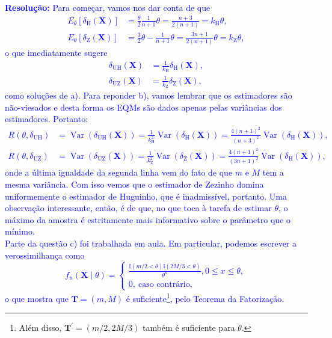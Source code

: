 \documentclass[a4paper,10pt, notitlepage]{report}
\newcommand{\vr}{\operatorname{Var}} %
\newcommand{\bX}{\boldsymbol{X}} %
\begin{document}
\textcolor{blue}{
\textbf{Resolução:} Para começar, vamos nos dar conta de que 
\begin{align*}
 E_\theta\left[\delta_{\text{H}}(\bX)\right] &= \frac{\theta}{2} \frac{1}{n+1}\theta = \frac{n+3}{2(n+1)} = k_{\text{H}}\theta,\\
 E_\theta\left[\delta_{\text{Z}}(\bX) \right] &= \frac{3}{2}\theta - \frac{1}{n+1}\theta = \frac{3n + 1}{2(n+1)}\theta = k_{\text{Z}}\theta,
\end{align*}
o que imediatamente sugere
\begin{align*}
 \delta_{\text{UH}}(\bX) &= \frac{1}{k_{\text{H}}}\delta_{\text{H}}(\bX),\\
\delta_{\text{UZ}}(\bX) &= \frac{1}{k_{\text{Z}}}\delta_{\text{Z}}(\bX),
\end{align*}
como soluções de a).
Para reponder b), vamos lembrar que os estimadores são não-viesados e desta forma os EQMs são dados apenas pelas variâncias dos estimadores.
Portanto:
\begin{align*}
R\left(\theta, \delta_{\text{UH}}\right) &= \vr\left(\delta_{\text{UH}}(\bX)\right) = \frac{1}{k_{\text{H}}^2}\vr\left( \delta_{\text{H}}(\bX)\right) = \frac{4(n+1)^2}{(n+3)^2}\vr\left( \delta_{\text{H}}(\bX)\right),\\
R\left(\theta, \delta_{\text{UZ}}\right) &= \vr\left(\delta_{\text{UZ}}(\bX)\right) = \frac{1}{k_{\text{Z}}^2}\vr\left( \delta_{\text{Z}}(\bX)\right) = \frac{4(n+1)^2}{(3n+1)^2}\vr\left( \delta_{\text{H}}(\bX)\right),
\end{align*}
onde a última igualdade da segunda linha vem do fato de que $m$ e $M$ tem a mesma variância. 
Com isso vemos que o estimador de Zezinho domina uniformemente o estimador de Huguinho, que é inadmissível, portanto.
Uma observação interessante, então, é de que, no que toca à tarefa de estimar $\theta$, o máximo da amostra é estritamente mais informativo sobre o parâmetro que o mínimo.
\\
Parte da questão c) foi trabalhada em aula.
Em particular, podemos escrever a verossimilhança como
$$
f_n(\bX \mid \theta) =  \begin{cases}
     \frac{\mathbb{I}\left( m/2 < \theta\right)\mathbb{I}\left(2M/3 < \theta\right)}{\theta^n}, 0 \leq x \leq \theta,\\
     0,\:\text{caso contrário},
\end{cases}
$$
o que mostra que $\boldsymbol{T} = (m, M)$ é suficiente\footnote{Além disso, $\boldsymbol{T}^\prime = (m/2, 2M/3)$ também é suficiente para $\theta$.}, pelo Teorema da Fatorização.
}
\end{document}
